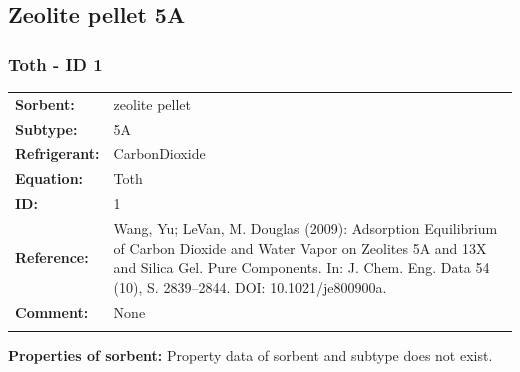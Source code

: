 \subsection{Zeolite pellet 5A}
%
\subsubsection{Toth - ID 1}
%
\begin{tabular}[l]{|lp{11.5cm}|}
\hline
\addlinespace

\textbf{Sorbent:} & zeolite pellet \\
\textbf{Subtype:} & 5A \\
\textbf{Refrigerant:} & CarbonDioxide \\
\textbf{Equation:} & Toth \\
\textbf{ID:} & 1 \\
\textbf{Reference:} & Wang, Yu; LeVan, M. Douglas (2009): Adsorption Equilibrium of Carbon Dioxide and Water Vapor on Zeolites 5A and 13X and Silica Gel. Pure Components. In: J. Chem. Eng. Data 54 (10), S. 2839–2844. DOI: 10.1021/je800900a. \\
\textbf{Comment:} & None \\

\addlinespace
\hline
\end{tabular}
\newline

\textbf{Properties of sorbent:}
\newline
%
Property data of sorbent and subtype does not exist.

